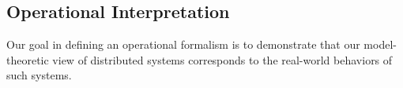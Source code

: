 \subsection{Operational Interpretation}
\label{sec:operational}

Our goal in defining an operational formalism is to demonstrate that our model-theoretic view of distributed systems corresponds to the real-world behaviors of such systems.

